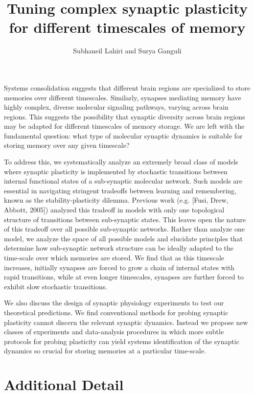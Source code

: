 \documentclass[12pt]{article}
\title{Tuning complex synaptic plasticity for different timescales of memory}
\author{Subhaneil Lahiri and Surya Ganguli}
\date{}
\begin{document}
\pagestyle{empty}
\maketitle
\thispagestyle{empty}


Systems consolidation suggests that different brain regions are specialized to store memories over different timescales. Similarly, synapses mediating memory have highly complex, diverse molecular signaling pathways, varying across brain regions. This suggests the possibility that synaptic diversity across brain regions may be adapted for different timescales of memory storage. We are left with the fundamental question: what type of molecular synaptic dynamics is suitable for storing memory over any given timescale?

To address this, we systematically analyze an extremely broad class of models where synaptic plasticity is implemented by stochastic transitions between internal functional states of a sub-synaptic molecular network. Such models are essential in navigating stringent tradeoffs between learning and remembering, known as the stability-plasticity dilemma. Previous work (e.g. [Fusi, Drew, Abbott, 2005]) analyzed this tradeoff in models with only one topological structure of transitions between sub-synaptic states.  This leaves open the nature of this tradeoff over all possible sub-synaptic networks.  Rather than analyze one model, we analyze the space of all possible models and elucidate principles that determine how sub-synaptic network structure can be ideally adapted to the time-scale over which memories are stored.  We find that as this timescale increases, initially synapses are forced to grow a chain of internal states with rapid transitions, while at even longer timescales, synapses are further forced to exhibit slow stochastic transitions.

We also discuss the design of synaptic physiology experiments to test our theoretical predictions.  We find conventional methods for probing synaptic plasticity cannot discern the relevant synaptic dynamics.  Instead we propose new classes of experiments and data-analysis procedures in which more subtle protocols for probing plasticity can yield systems identification of the synaptic dynamics so crucial for storing memories at a particular time-scale.

\section*{Additional Detail}
\end{document}
